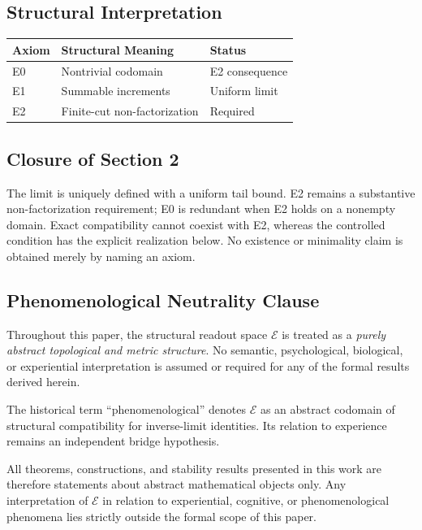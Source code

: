 \documentclass[11pt,a4paper]{article}
\theoremstyle{plain}
\theoremstyle{definition}
\theoremstyle{remark}
\begin{document}
\subsection{Structural Interpretation}

\begin{center}
\begin{tabular}{|l|l|l|}
\hline
\textbf{Axiom} & \textbf{Structural Meaning} & \textbf{Status} \\
\hline
E0 & Nontrivial codomain & E2 consequence \\
\hline
E1 & Summable increments & Uniform limit \\
\hline
E2 & Finite-cut non-factorization & Required \\
\hline
\end{tabular}
\end{center}

\subsection{Closure of Section 2}
The limit is uniquely defined with a uniform tail bound. E2 remains a substantive non-factorization requirement; E0 is redundant when E2 holds on a nonempty domain. Exact compatibility cannot coexist with E2, whereas the controlled condition has the explicit realization below. No existence or minimality claim is obtained merely by naming an axiom.

\subsection{Phenomenological Neutrality Clause}

Throughout this paper, the structural readout space $\mathcal{E}$ is treated as a \textit{purely abstract topological and metric structure}. No semantic, psychological, biological, or experiential interpretation is assumed or required for any of the formal results derived herein.

The historical term ``phenomenological'' denotes $\mathcal{E}$ as an abstract codomain of structural compatibility for inverse-limit identities. Its relation to experience remains an independent bridge hypothesis.

All theorems, constructions, and stability results presented in this work are therefore statements about abstract mathematical objects only. Any interpretation of $\mathcal{E}$ in relation to experiential, cognitive, or phenomenological phenomena lies strictly outside the formal scope of this paper.
\end{document}
